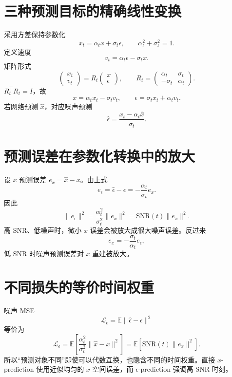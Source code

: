 \documentclass[UTF8,12pt,a4paper,fontset=none]{ctexart}
\numberwithin{equation}{section}
\newcommand{\E}{\mathbb{E}}
\newcommand{\Loss}{\mathcal{L}}
\begin{document}
\section{三种预测目标的精确线性变换}
采用方差保持参数化
\begin{equation}
 x_t=\alpha_t x+\sigma_t\epsilon,
 \qquad \alpha_t^2+\sigma_t^2=1.
\end{equation}
定义速度
\begin{equation}
 v_t=\alpha_t\epsilon-\sigma_t x.
\end{equation}
矩阵形式
\begin{equation}
 \begin{pmatrix}x_t\\v_t\end{pmatrix}
 =R_t\begin{pmatrix}x\\\epsilon\end{pmatrix},
 \qquad
 R_t=\begin{pmatrix}\alpha_t&\sigma_t\\-\sigma_t&\alpha_t\end{pmatrix}.
\end{equation}
$R_t^\top R_t=I$，故
\begin{equation}
 x=\alpha_tx_t-\sigma_tv_t,
 \qquad
 \epsilon=\sigma_tx_t+\alpha_tv_t.
\end{equation}
若网络预测 $\widehat x$，对应噪声预测
\begin{equation}
 \widehat\epsilon=\frac{x_t-\alpha_t\widehat x}{\sigma_t}.
\end{equation}

\section{预测误差在参数化转换中的放大}
设 $x$ 预测误差 $e_x=\widehat x-x$。由上式
\begin{equation}
 e_\epsilon=\widehat\epsilon-\epsilon
 =-\frac{\alpha_t}{\sigma_t}e_x.
\end{equation}
因此
\begin{equation}
 \|e_\epsilon\|^2=\frac{\alpha_t^2}{\sigma_t^2}\|e_x\|^2
 =\mathrm{SNR}(t)\|e_x\|^2.
\end{equation}
高 SNR、低噪声时，微小 $x$ 误差会被放大成很大噪声误差。反过来
\begin{equation}
 e_x=-\frac{\sigma_t}{\alpha_t}e_\epsilon,
\end{equation}
低 SNR 时噪声预测误差对 $x$ 重建被放大。

\section{不同损失的等价时间权重}
噪声 MSE
\begin{equation}
 \Loss_\epsilon=\E\|\widehat\epsilon-\epsilon\|^2
\end{equation}
等价为
\begin{equation}
 \Loss_\epsilon=
 \E\left[\frac{\alpha_t^2}{\sigma_t^2}
 \|\widehat x-x\|^2\right]
 =\E[\mathrm{SNR}(t)\|e_x\|^2].
\end{equation}
所以“预测对象不同”即使可以代数互换，也隐含不同的时间权重。直接 $x$-prediction 使用近似均匀的 $x$ 空间误差，而 $\epsilon$-prediction 强调高 SNR 时刻。
\end{document}
